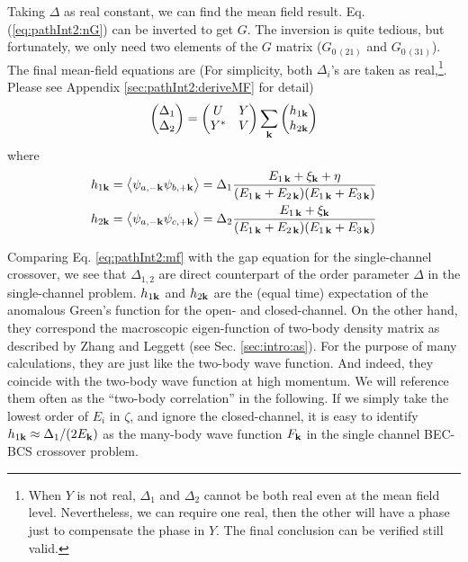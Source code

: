  
 Taking $\Delta$ as real constant,
  we can find the mean field result. Eq. (\ref{eq:pathInt2:nG}) can be inverted to get $G$.  The inversion is quite tedious, but fortunately, we only need two elements of the $G$ matrix ($G_{0\, (21)}$ and $G_{0 \,(31)}$).  The final mean-field equations are (For simplicity,  both $\Delta_{i}$'s are taken as real,\footnote{\label{foot:pathInt2:real}When $Y$ is not real, $\Delta_{1}$ and $\Delta_{2}$ cannot be both real even at the mean field level.  Nevertheless, we can require one  real, then the other will have a phase just to compensate the phase in $Y$.  The final conclusion can be verified  still valid.   }. Please see Appendix \ref{sec:pathInt2:deriveMF} for detail) 
  \begin{equation}\label{eq:pathInt2:mf}
\begin{pmatrix}\Delta_1\\\Delta_2\end{pmatrix}=\begin{pmatrix}U&Y\\Y^{*}&V\end{pmatrix}\sum_{\mathbf{k}}\begin{pmatrix}h_{1\mathbf{k}}\\h_{2\mathbf{k}}\end{pmatrix}
\end{equation}
  where 
  \begin{gather}
  h_{1\mathbf{k}}=\bigl<{\psi_{a,-{\mathbf{k}}}\psi_{b,+{\mathbf{k}}}}\bigr>
  =\Delta_{1}\frac{E_{1\,\mathbf{k}}+\xi_{\mathbf{k}}+\eta}{(E_{1\,\mathbf{k}}+E_{2\,\mathbf{k}})(E_{1\,\mathbf{k}}+E_{3\,\mathbf{k}})}\label{eq:pathInt2:h1}\\
  h_{2\mathbf{k}}=\bigl<{\psi_{a,-{\mathbf{k}}}\psi_{c,+{\mathbf{k}}}}\bigr>
  =\Delta_{2}\frac{E_{1\,\mathbf{k}}+\xi_{\mathbf{k}}}{(E_{1\,\mathbf{k}}+E_{2\,\mathbf{k}})(E_{1\,\mathbf{k}}+E_{3\,\mathbf{k}})}\label{eq:pathInt2:h2}
  \end{gather}


Comparing Eq. \ref{eq:pathInt2:mf} with the gap equation for the single-channel crossover, we  see that $\Delta_{1,2}$ are  direct counterpart of the order parameter $\Delta$ in the single-channel problem. 
$h_{1\mathbf{k}}$ and $h_{2\mathbf{k}}$ are the (equal time)  expectation of the anomalous Green's function for the open- and closed-channel. On the other hand, they correspond the macroscopic eigen-function of two-body density matrix as described by Zhang and Leggett\cite{ZhangThesis,shizhongUniv} (see Sec. \ref{sec:intro:as}). For the purpose of many calculations, they are just like the two-body wave function. And indeed, they coincide with the two-body wave function at high momentum.  We will reference them often as the ``two-body correlation'' in the following.  
If we simply take the lowest order of $E_{i}$ in $\zeta$, and ignore the closed-channel, it is easy to identify $h_{1\mathbf{k}}\approx{\Delta_{1}}/(2E_{\mathbf{k}})$ as the many-body wave function $F_{\mathbf{k}}$ in the single channel BEC-BCS crossover problem.  


